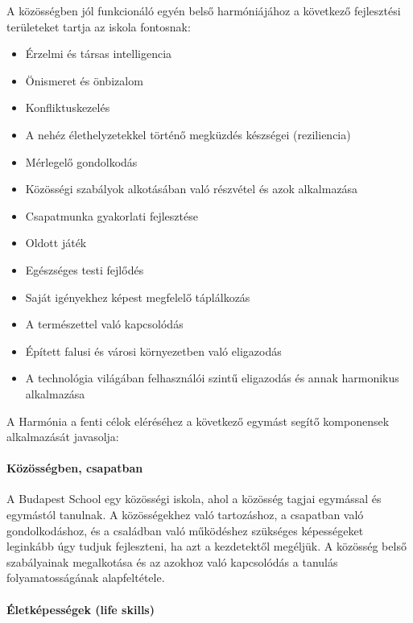 A közösségben jól funkcionáló egyén belső harmóniájához a következő
fejlesztési területeket tartja az iskola fontosnak:

\begin{itemize}
\item
  Érzelmi és társas intelligencia
\item
  Önismeret és önbizalom
\item
  Konfliktuskezelés
\item
  A nehéz élethelyzetekkel történő megküzdés készségei (reziliencia)
\item
  Mérlegelő gondolkodás
\item
  Közösségi szabályok alkotásában való részvétel és azok alkalmazása
\item
  Csapatmunka gyakorlati fejlesztése
\item
  Oldott játék
\item
  Egészséges testi fejlődés
\item
  Saját igényekhez képest megfelelő táplálkozás
\item
  A természettel való kapcsolódás
\item
  Épített falusi és városi környezetben való eligazodás
\item
  A technológia világában felhasználói szintű eligazodás és annak\break
  harmonikus alkalmazása
\end{itemize}

A Harmónia a fenti célok eléréséhez a következő egymást segítő
komponensek alkalmazását javasolja:

\hypertarget{kozossegben-csapatban}{%
\paragraph{Közösségben, csapatban}\label{kozossegben-csapatban}}

A Budapest School egy közösségi iskola, ahol a közösség tagjai egymással
és egymástól tanulnak. A közösségekhez való tartozáshoz, a csapatban
való gondolkodáshoz, és a családban való működéshez szükséges
képességeket leginkább úgy tudjuk fejleszteni, ha azt a kezdetektől
megéljük. A közösség belső szabályainak megalkotása és az azokhoz való
kapcsolódás a tanulás folyamatosságának alapfeltétele.

\hypertarget{eletkepessegek-life-skills}{%
\paragraph{Életképességek (life
skills)}\label{eletkepessegek-life-skills}}

